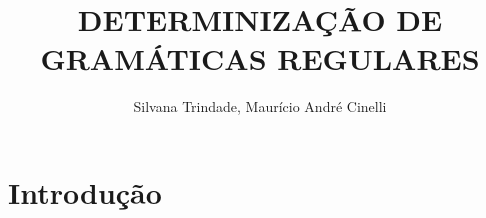 \documentclass[10pt,a4paper,titlepage]{hitec}
\author{Silvana Trindade, Maurício André Cinelli}
\title{DETERMINIZAÇÃO DE GRAMÁTICAS REGULARES }
\begin{document}
\maketitle

\section*{Introdução}
\end{document}
